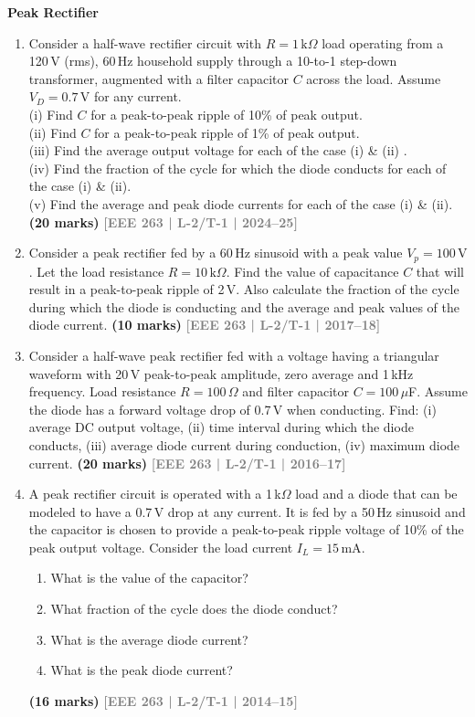 \documentclass[12pt,a3paper]{article}
\newcommand{\yr}[1]{\hfill\textcolor{gray}{\small\textbf{[#1]}}}
\newcommand{\mk}[1]{\textcolor{orange!70!black}{\small\textbf{(#1 marks)}}}
\newcommand{\subtopic}[2]{%
  \vspace{10pt}
  \noindent\begin{tcolorbox}[colback=#1!8,colframe=#1,boxrule=0.6pt,arc=4pt,
    left=6pt,right=6pt,top=4pt,bottom=4pt]
    \small\bfseries\textcolor{#1}{#2}
  \end{tcolorbox}
  \vspace{2pt}
}
\begin{document}
\subtopic{cA}{Peak Rectifier}
\label{sub:s1-peak}

\begin{enumerate}\item Consider a half-wave rectifier circuit with $R=1\,\text{k}\Omega$ load operating from a 120\,V (rms), 60\,Hz household supply through a 10-to-1 step-down transformer, augmented with a filter capacitor $C$ across the load. Assume $V_D=0.7\,\text{V}$ for any current. \\
(i) Find $C$ for a peak-to-peak ripple of 10\% of peak output.\\
 (ii) Find $C$ for a peak-to-peak ripple of 1\% of peak output. \\
 (iii) Find the average output voltage for each of the case (i) \& (ii) . \\
 (iv) Find the fraction of the cycle for which the diode conducts for each of the case (i) \& (ii).\\
 (v) Find the average and peak diode currents for each of the case (i) \& (ii).\\
\mk{20} \yr{EEE 263 | L-2/T-1 | 2024--25}

\item Consider a peak rectifier fed by a 60\,Hz sinusoid with a peak value $V_p=100\,\text{V}$. Let the load resistance $R=10\,\text{k}\Omega$. Find the value of capacitance $C$ that will result in a peak-to-peak ripple of 2\,V. Also calculate the fraction of the cycle during which the diode is conducting and the average and peak values of the diode current.
\mk{10} \yr{EEE 263 | L-2/T-1 | 2017--18}

\item Consider a half-wave peak rectifier fed with a voltage having a triangular waveform with 20\,V peak-to-peak amplitude, zero average and 1\,kHz frequency. Load resistance $R=100\,\Omega$ and filter capacitor $C=100\,\mu$F. Assume the diode has a forward voltage drop of 0.7\,V when conducting. Find: (i) average DC output voltage, (ii) time interval during which the diode conducts, (iii) average diode current during conduction, (iv) maximum diode current.
\mk{20} \yr{EEE 263 | L-2/T-1 | 2016--17}

\item A peak rectifier circuit is operated with a 1\,k$\Omega$ load and a diode that can be modeled to have a 0.7\,V drop at any current. It is fed by a 50\,Hz sinusoid and the capacitor is chosen to provide a peak-to-peak ripple voltage of 10\% of the peak output voltage. Consider the load current $I_L = 15\,\text{mA}$.
\begin{enumerate}
  \item What is the value of the capacitor?
  \item What fraction of the cycle does the diode conduct?
  \item What is the average diode current?
  \item What is the peak diode current?
\end{enumerate}
\mk{16} \yr{EEE 263 | L-2/T-1 | 2014--15}

\end{enumerate}
\end{document}
